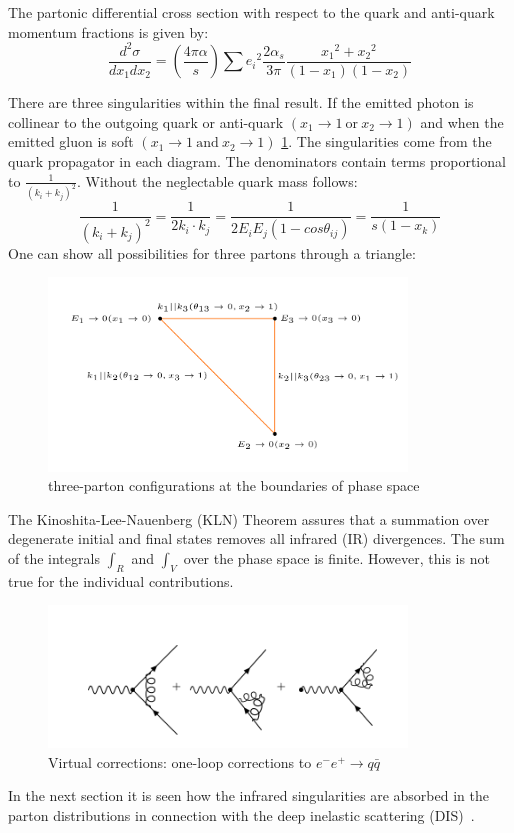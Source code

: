 The partonic differential cross section with respect to the quark and anti-quark momentum fractions is given by:
\begin{equation}
\frac{d^2 \sigma}{dx_1 dx_2}= (\frac{4\pi \alpha}{s})\sum {e_i}^2 
\frac{2\alpha_s}{3\pi} \frac{{x_1}^2+{x_2}^2}{(1-x_1)(1-x_2)}
\label{fully}
\end{equation}

There are three singularities within the final result. 
If the emitted photon is collinear to the outgoing quark or anti-quark $ (x_1 \rightarrow 1 \:\text{or}\: x_2 \rightarrow 1) $ and when the emitted gluon is soft $ (x_1 \rightarrow 1\: \text{and}\: x_2 \rightarrow 1 )$ \ref{conf}.
The singularities come from the quark propagator in each diagram. The denominators contain terms proportional to $ \frac{1}{(k_i + k_j)^2}  $. Without the neglectable quark mass follows:
\begin{equation}
\frac{1}{(k_i + k_j)^2}=\frac{1}{2k_i \cdot k_j}=\frac{1}{2E_iE_j(1-cos\theta_{ij})}=\frac{1}{s(1- x_k)}
\end{equation} 
\pagebreak
One can show all possibilities for three partons through a triangle:

\begin{figure}[h!]
\centering
\includegraphics[width=0.85\textwidth]{images/Intro/triangle.png}
\caption{three-parton configurations at the boundaries
of phase space}
\label{conf}
\end{figure}

The Kinoshita-Lee-Nauenberg (KLN) Theorem assures that a summation over degenerate initial and final states removes all infrared (IR) divergences.
The sum of the integrals $ \int_R $ and $ \int_V $ over the phase space is finite. However, this is not true for the individual contributions.
\begin{figure}[h!]
\centering
\includegraphics[width=0.85\textwidth]{images/Intro/virtual.png}
\caption{Virtual corrections: one-loop corrections to $  e^- e^+ \rightarrow q\bar{q} $}
\end{figure}
In the next section it is seen how the infrared singularities are absorbed in the parton distributions in connection with the deep inelastic scattering (DIS)~\cite{Cunha13}.
\newpage
